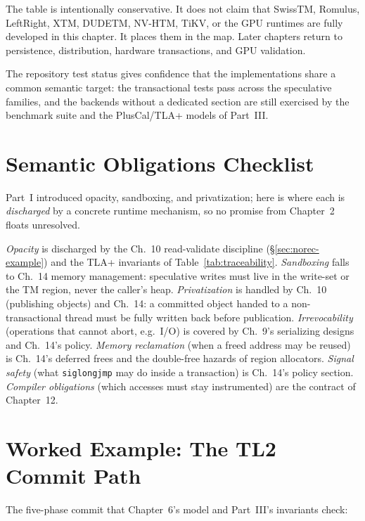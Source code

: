 The table is intentionally conservative. It does not claim that SwissTM, Romulus, LeftRight, XTM, DUDETM, NV-HTM, TiKV, or the GPU runtimes are fully developed in this chapter. It places them in the map. Later chapters return to persistence, distribution, hardware transactions, and GPU validation.

The repository test status gives confidence that the implementations share a common semantic target: the transactional tests pass across the speculative families, and the backends without a dedicated section are still exercised by the benchmark suite and the PlusCal/TLA+ models of Part~III.

\section{Semantic Obligations Checklist}
\label{sec:semantic-obligations}
Part~I introduced opacity, sandboxing, and privatization; here is where each is \emph{discharged} by a concrete runtime mechanism, so no promise from Chapter~2 floats unresolved.

\emph{Opacity} is discharged by the Ch.~10 read-validate discipline (\S\ref{sec:norec-example}) and the TLA+ invariants of Table~\ref{tab:traceability}. \emph{Sandboxing} falls to Ch.~14 memory management: speculative writes must live in the write-set or the TM region, never the caller's heap. \emph{Privatization} is handled by Ch.~10 (publishing objects) and Ch.~14: a committed object handed to a non-transactional thread must be fully written back before publication. \emph{Irrevocability} (operations that cannot abort, e.g.\ I/O) is covered by Ch.~9's serializing designs and Ch.~14's policy. \emph{Memory reclamation} (when a freed address may be reused) is Ch.~14's deferred frees and the double-free hazards of region allocators. \emph{Signal safety} (what \texttt{siglongjmp} may do inside a transaction) is Ch.~14's policy section. \emph{Compiler obligations} (which accesses must stay instrumented) are the contract of Chapter~12.

\section{Worked Example: The TL2 Commit Path}
\label{sec:tl2-example}

The five-phase commit that Chapter~6's model and Part~III's invariants check:

